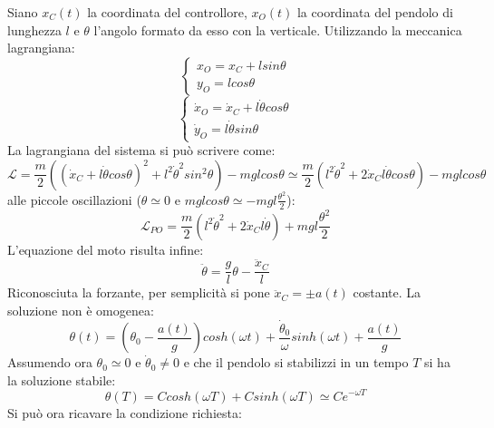 \documentclass[12pt, a4paper]{book}
\theoremstyle{theorem}
\begin{document}
				Siano $x_{C}(t)$ la coordinata del controllore, $x_{O}(t)$ la coordinata del pendolo di lunghezza $l$ e $\theta$ l'angolo formato da esso con la verticale.
				Utilizzando la meccanica lagrangiana:
				\begin{equation}
					\begin{cases}
						x_{O}=x_{C}+lsin\theta\\
						y_{O}=lcos\theta
					\end{cases}
				\end{equation}
				\begin{equation}
					\begin{cases}
						\dot{x}_O=\dot{x}_{C}+l\dot{\theta}cos\theta\\
						\dot{y}_{O}=l\dot{\theta}sin\theta
					\end{cases}
				\end{equation}
				La lagrangiana del sistema si può scrivere come:
				\begin{equation}
					\mathcal{L}=\frac{m}{2}\left( \left( \dot{x}_{C}+l\dot{\theta}cos\theta \right)^2 + l^2\dot{\theta}^2sin^2\theta \right) - mglcos\theta \simeq \frac{m}{2}\left( l^2\dot{\theta}^2 + 2\dot{x}_{C}l\dot{\theta}cos\theta \right) - mglcos\theta
				\end{equation}
				alle piccole oscillazioni ($\theta\simeq 0$ e $mglcos\theta\simeq -mgl\frac{\theta^2}{2}$):
				\begin{equation}
					\mathcal{L}_{PO}=\frac{m}{2}\left( l^2\dot{\theta}^2 + 2\dot{x}_{C}l\dot{\theta} \right) + mgl\frac{\theta^2}{2}
				\end{equation}
				L'equazione del moto risulta infine:
				\begin{equation}
					\ddot{\theta}=\frac{g}{l}\theta - \frac{\ddot{x}_C}{l}
				\end{equation}
				Riconosciuta la forzante, per semplicità si pone $\ddot{x}_C=\pm a(t)$ costante.
				La soluzione non è omogenea:
				\begin{equation}
					\theta(t)=\left( \theta_{0} -\frac{a(t)}{g} \right)cosh(\omega t) + \frac{\dot{\theta}_0}{\omega}sinh(\omega t) +\frac{a(t)}{g}
				\end{equation}
				Assumendo ora $\theta_0\simeq 0$ e $\dot{\theta}_0\neq 0$ e che il pendolo si stabilizzi in un tempo $T$ si ha la soluzione stabile:
				\begin{equation}
					\theta(T)=Ccosh(\omega T) + Csinh(\omega T) \simeq Ce^{-\omega T}
				\end{equation}
				Si può ora ricavare la condizione richiesta:
\end{document}
